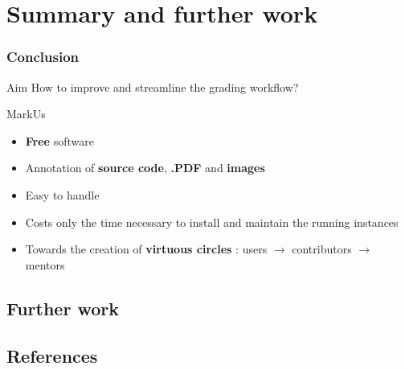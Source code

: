 \documentclass[hyperref,french,usenames,xcolor=dvipsnames]{beamer}
\begin{document}
\section*{Summary and further work}

\frame
{
  \frametitle{Conclusion}

\begin{alertblock}{Aim}
How to improve and streamline the grading workflow? 
\end{alertblock}

\begin{block}{MarkUs}

\begin{itemize}
\item \textbf{Free} software 
\item Annotation of \textbf{source code}, \textbf{.PDF} and \textbf{images} 
\item Easy to handle
\item Costs only the time necessary to install and maintain the running instances
\item Towards the creation of \textbf{virtuous circles} : users $\rightarrow$ contributors $\rightarrow$ mentors
\end{itemize}
\end{block}
}

\subsection*{Further work}


\subsection*{References}
\end{document}
